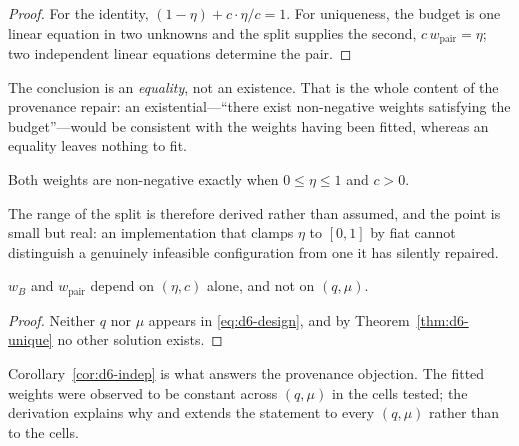 \begin{proof}
For the identity, $(1-\eta)+c\cdot\eta/c=1$. For uniqueness, the budget is one linear
equation in two unknowns and the split supplies the second, $c\,w_{\mathrm{pair}}=\eta$; two
independent linear equations determine the pair.
\end{proof}


The conclusion is an \emph{equality}, not an existence. That is the whole content of the
provenance repair: an existential---``there exist non-negative weights satisfying the
budget''---would be consistent with the weights having been fitted, whereas an equality leaves
nothing to fit.

\begin{proposition}
\label{prop:d6-nonneg}
Both weights are non-negative exactly when $0\le\eta\le1$ and $c>0$.
\end{proposition}


The range of the split is therefore derived rather than assumed, and the point is small but
real: an implementation that clamps $\eta$ to $[0,1]$ by fiat cannot distinguish a genuinely
infeasible configuration from one it has silently repaired.

\begin{corollary}
\label{cor:d6-indep}
$w_{B}$ and $w_{\mathrm{pair}}$ depend on $(\eta,c)$ alone, and not on $(q,\mu)$.
\end{corollary}

\begin{proof}
Neither $q$ nor $\mu$ appears in \eqref{eq:d6-design}, and by Theorem~\ref{thm:d6-unique} no other
solution exists.
\end{proof}

Corollary~\ref{cor:d6-indep} is what answers the provenance objection. The fitted weights were
observed to be constant across $(q,\mu)$ in the cells tested; the derivation explains why and
extends the statement to every $(q,\mu)$ rather than to the cells.

